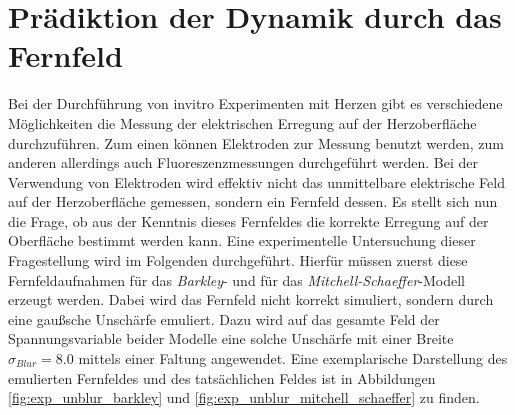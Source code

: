 \section{Prädiktion der Dynamik durch das Fernfeld}
Bei der Durchführung von invitro Experimenten mit Herzen gibt es verschiedene Möglichkeiten die Messung der elektrischen Erregung auf der Herzoberfläche durchzuführen. Zum einen können Elektroden zur Messung benutzt werden, zum anderen allerdings auch Fluoreszenzmessungen durchgeführt werden. Bei der Verwendung von Elektroden wird effektiv nicht das unmittelbare elektrische Feld auf der Herzoberfläche gemessen, sondern ein Fernfeld dessen. Es stellt sich nun die Frage, ob aus der Kenntnis dieses Fernfeldes die korrekte Erregung auf der Oberfläche bestimmt werden kann. Eine experimentelle Untersuchung dieser Fragestellung wird im Folgenden durchgeführt. Hierfür müssen zuerst diese Fernfeldaufnahmen für das \textit{Barkley}- und für das \textit{Mitchell-Schaeffer}-Modell erzeugt werden. Dabei wird das Fernfeld nicht korrekt simuliert, sondern durch eine gaußsche Unschärfe emuliert. Dazu wird auf das gesamte Feld der Spannungsvariable beider Modelle eine solche Unschärfe mit einer Breite $\sigma_{Blur} = 8.0$ mittels einer Faltung angewendet. Eine exemplarische Darstellung des emulierten Fernfeldes und des tatsächlichen Feldes ist in Abbildungen \ref{fig:exp_unblur_barkley} und \ref{fig:exp_unblur_mitchell_schaeffer} zu finden.

